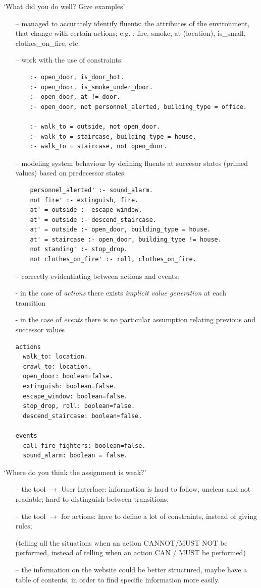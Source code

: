 \documentclass[a4paper,12pt]{report}
\begin{document}
%
{\color{Orange}‘What did you do well? Give examples’}
%
\begin{itemize}
\item[--] managed to accurately identify fluents: the attributes of the environment, that change with certain actions; 
e.g. : fire, smoke, at (location), is\_small, clothes\_on\_fire, etc.
\item[--] work with the use of constraints:
\begin{verbatim}
	:- open_door, is_door_hot.
	:- open_door, is_smoke_under_door.
	:- open_door, at != door.
	:- open_door, not personnel_alerted, building_type = office.

	:- walk_to = outside, not open_door. 
	:- walk_to = staircase, building_type = house.
	:- walk_to = staircase, not open_door.
\end{verbatim}
\item[--] modeling system behaviour by defining fluents at succesor states (primed values) based on predecessor states:
\begin{verbatim}
	personnel_alerted' :- sound_alarm.
	not fire' :- extinguish, fire.
	at' = outside :- escape_window.
	at' = outside :- descend_staircase.
	at' = outside :- open_door, building_type = house.
	at' = staircase :- open_door, building_type != house.
	not standing' :- stop_drop.
	not clothes_on_fire' :- roll, clothes_on_fire.	
\end{verbatim}
\item[--] correctly evidentiating between actions and events:

- in the case of {\it actions} there exists {\it  implicit value generation} at each transition

- in the case of {\it events} there is no particular assumption relating previous and successor values
\begin{verbatim}
actions
  walk_to: location.
  crawl_to: location.
  open_door: boolean=false.
  extinguish: boolean=false.
  escape_window: boolean=false.
  stop_drop, roll: boolean=false.
  descend_staircase: boolean=false.	

events 
  call_fire_fighters: boolean=false.
  sound_alarm: boolean = false.
\end{verbatim}

\end{itemize}
%
{\color{Orange}‘Where do you think the assignment is weak?’}
%
\begin{itemize}
\item[--] the tool $\rightarrow$ User Interface: information is hard to follow, unclear and not readable;
 hard to distinguish between transitions.
\item[--] the tool $\rightarrow$ for actions: have to define a lot of constraints, instead of giving rules;

(telling all the situations when an action CANNOT/MUST NOT be performed, instead of telling when an action CAN / MUST be performed)
\item[--] the information on the website could be better structured, maybe have a table of contents, in order to find specific information more easily.

\end{itemize}
\end{document}
